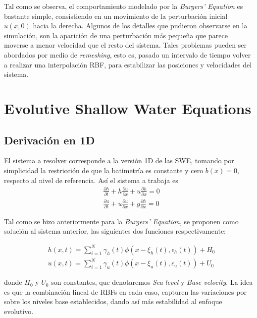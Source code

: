﻿\documentclass[spanish]{article}
\begin{document}
    Tal como se observa, el comportamiento modelado por la \textit{Burgers' Equation} es bastante simple, consistiendo en un
    movimiento de la perturbación inicial $u(x,0)$ hacia la derecha. Algunos de los detalles que pudieron
    observarse en la simulación, son la aparición de una perturbación más pequeña que parece moverse a menor velocidad que el
    resto del sistema. Tales problemas pueden ser abordados por medio de \textit{remeshing}, esto es, pasado un intervalo de tiempo volver a realizar una interpolación RBF, para estabilizar las posiciones y velocidades del sistema.
    
    \section{Evolutive Shallow Water Equations}

    \subsection{Derivación en 1D}

    El sistema a resolver corresponde a la versión 1D de las SWE, tomando por simplicidad la restricción de que la batimetría es constante y cero $b(x)=0$, respecto al nivel de referencia. Así el sistema a trabaja es
\begin{align}
 & \frac{\partial h}{\partial t} + h \frac{\partial u}{\partial x} + u \frac{\partial h}{\partial x} = 0 \label{eq:continuity}\\
 & \frac{\partial u}{\partial t} + u \frac{\partial u}{\partial x} + g \frac{\partial h}{\partial x} = 0 \label{eq:momentum}
\end{align}

    Tal como se hizo anteriormente para la \textit{Burgers' Equation}, se proponen como solución al sistema anterior, las siguientes dos funciones respectivamente:

\begin{align}
     & h(x,t) = \sum_{i=1}^{N} \gamma_h(t)\phi(x-\xi_h(t),\epsilon_h(t)) + H_0 \label{eq:happ}\\
     & u(x,t) = \sum_{i=1}^{N} \gamma_u(t)\phi(x-\xi_u(t),\epsilon_u(t)) + U_0 \label{eq:uapp}
 \end{align}

     donde $H_0$ y $U_0$ son constantes, que denotaremos \textit{Sea level} y \textit{Base velocity}. La idea es que la
     combinación lineal de RBFs en cada caso, capturen las variaciones por sobre los niveles base establecidos, dando así
     más estabilidad al enfoque evolutivo.
\end{document}
